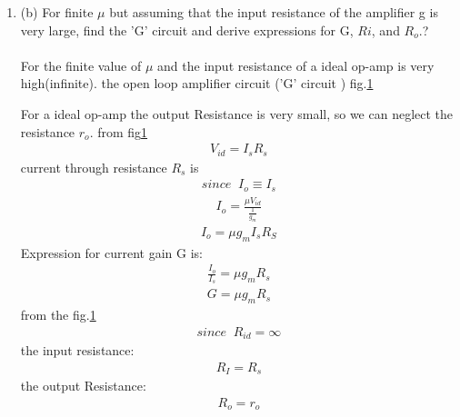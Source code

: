 \begin{enumerate}[label=\thesection.\arabic*.,ref=\thesection.\theenumi]
\item
\label{Question_1b_ee18btech11023}
(b) For finite $\mu$ but assuming that the input resistance of the
amplifier g is very large, find the 'G' circuit and derive
expressions for G, $Ri$, and $R_o$.?
\\
\solution\\
For the finite value of $\mu$ and the input resistance of a ideal op-amp is very high(infinite).
the open loop amplifier circuit ('G' circuit ) fig.\ref{fig:small ckt1}
\begin{figure}[!ht]
	\begin{center}
			\resizebox{\columnwidth}{!}{}
	\end{center}
\caption{}
\label{fig:small ckt1}
\end{figure}

For a ideal op-amp the output Resistance is very small, so we can neglect the resistance $r_o$.  from fig\ref{fig:small ckt1}
\begin{align}
    V_{id} = I_sR_s
    \label{eq_ee18btech11023_7}
\end{align}
current through resistance $R_s$ is
\begin{align*}
    since\;\;I_o \equiv I_s
\end{align*}
\begin{align}
    I_o = \frac{\mu V_{id}}{\frac{1}{g_m}} 
    \label{eq_ee18btech11023_8}
\end{align}
\begin{align}
    I_o = \mu g_m I_s R_S
    \label{eq_ee18btech11023_9}
\end{align}
Expression for current gain G is:
\begin{align}
    \frac{I_o}{I_s} = \mu g_m R_s
    \label{eq_ee18btech11023_10}
\end{align}
\begin{align}
    G = \mu g_m R_s
    \label{eq_ee18btech11023_11}
\end{align}
from the fig.\ref{fig:small ckt1}
\begin{align*}
    since \;\; R_{id} = \infty
\end{align*}
the input resistance:
\begin{align}
    R_I = R_s
    \label{eq_ee18btech11023_12}
\end{align}
the output Resistance:
\begin{align}
    R_o = r_o
    \label{eq_ee18btech11023_13}
\end{align}


\end{enumerate}
